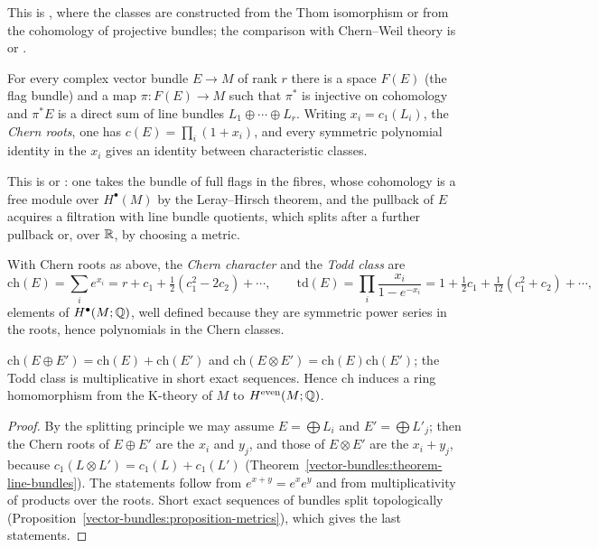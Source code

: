 This is \cite[Chapter 14]{milnor-stasheff}, where the classes are constructed from the Thom isomorphism or from the cohomology of projective bundles; the comparison with Chern--Weil theory is
\cite[Appendix C]{milnor-stasheff} or \cite[Chapter 1]{griffiths-harris}.

\begin{theorem}\label{characteristic-classes:theorem-splitting}
For every complex vector bundle $E \to M$ of rank $r$ there is a space $F(E)$ (the flag bundle) and a map $\pi \colon F(E) \to M$ such that $\pi^*$ is injective on cohomology and $\pi^*E$ is a direct sum of line
bundles $L_1 \oplus \cdots \oplus L_r$. Writing $x_i = c_1(L_i)$, the \emph{Chern roots}, one has $c(E) = \prod_i(1 + x_i)$, and every symmetric polynomial identity in the $x_i$ gives an identity between
characteristic classes.
\end{theorem}

This is \cite[Chapter 21]{bott-tu} or \cite[Chapter 14]{milnor-stasheff}: one takes the bundle of full flags in the fibres, whose cohomology is a free module over $H^\bullet(M)$ by the Leray--Hirsch
theorem, and the pullback of $E$ acquires a filtration with line bundle quotients, which splits after a further pullback or, over $\mathbb{R}$, by choosing a metric.

\begin{definition}\label{characteristic-classes:definition-chern-character}
With Chern roots as above, the \emph{Chern character} and the \emph{Todd class} are
\[
\mathrm{ch}(E) = \sum_ie^{x_i} = r + c_1 + \tfrac12(c_1^2 - 2c_2) + \cdots, \qquad \mathrm{td}(E) = \prod_i\frac{x_i}{1 - e^{-x_i}} = 1 + \tfrac12c_1 + \tfrac{1}{12}(c_1^2 + c_2) + \cdots,
\]
elements of $H^\bullet(M; \mathbb{Q})$, well defined because they are symmetric power series in the roots, hence polynomials in the Chern classes.
\end{definition}

\begin{proposition}\label{characteristic-classes:proposition-chern-character}
$\mathrm{ch}(E \oplus E') = \mathrm{ch}(E) + \mathrm{ch}(E')$ and $\mathrm{ch}(E \otimes E') = \mathrm{ch}(E)\mathrm{ch}(E')$; the Todd class is multiplicative in short exact sequences. Hence $\mathrm{ch}$ induces a
ring homomorphism from the K-theory of $M$ to $H^{\mathrm{even}}(M; \mathbb{Q})$.
\end{proposition}

\begin{proof}
By the splitting principle we may assume $E = \bigoplus L_i$ and $E' = \bigoplus L'_j$; then the Chern roots of $E \oplus E'$ are the $x_i$ and $y_j$, and those of $E \otimes E'$ are the $x_i + y_j$, because
$c_1(L \otimes L') = c_1(L) + c_1(L')$ (Theorem~\ref{vector-bundles:theorem-line-bundles}). The statements follow from $e^{x+y} = e^xe^y$ and from multiplicativity of products over the roots. Short exact
sequences of bundles split topologically (Proposition~\ref{vector-bundles:proposition-metrics}), which gives the last statements.
\end{proof}

